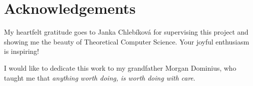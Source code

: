 \section*{Acknowledgements}

My heartfelt gratitude goes to Janka Chlebíková for supervising this project and showing me the beauty of Theoretical Computer Science. Your joyful enthusiasm is inspiring!

I would like to dedicate this work to my grandfather Morgan Dominius, who taught me that \textit{anything worth doing, is worth doing with care}.
